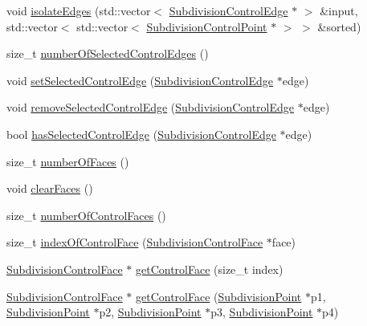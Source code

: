 \begin{DoxyCompactItemize}
\item 
void \hyperlink{classShipCAD_1_1SubdivisionSurface_a975c97ca338eb2aaaa3dcc0640611a95}{isolate\-Edges} (std\-::vector$<$ \hyperlink{classShipCAD_1_1SubdivisionControlEdge}{Subdivision\-Control\-Edge} $\ast$ $>$ \&input, std\-::vector$<$ std\-::vector$<$ \hyperlink{classShipCAD_1_1SubdivisionControlPoint}{Subdivision\-Control\-Point} $\ast$ $>$ $>$ \&sorted)
\item 
size\-\_\-t \hyperlink{classShipCAD_1_1SubdivisionSurface_a28f394042987ccc30d947ddd98a62574}{number\-Of\-Selected\-Control\-Edges} ()
\item 
void \hyperlink{classShipCAD_1_1SubdivisionSurface_ae1ceb8323935d0734fe4dc9c324aca16}{set\-Selected\-Control\-Edge} (\hyperlink{classShipCAD_1_1SubdivisionControlEdge}{Subdivision\-Control\-Edge} $\ast$edge)
\item 
void \hyperlink{classShipCAD_1_1SubdivisionSurface_a579077d742f9afc4e1d4ad20ef5a2184}{remove\-Selected\-Control\-Edge} (\hyperlink{classShipCAD_1_1SubdivisionControlEdge}{Subdivision\-Control\-Edge} $\ast$edge)
\item 
bool \hyperlink{classShipCAD_1_1SubdivisionSurface_a3f7856ea95b0c881a1171845c1dc817e}{has\-Selected\-Control\-Edge} (\hyperlink{classShipCAD_1_1SubdivisionControlEdge}{Subdivision\-Control\-Edge} $\ast$edge)
\item 
size\-\_\-t \hyperlink{classShipCAD_1_1SubdivisionSurface_a9f67bb8bbd3a8f61a2b4abacc0cf10e4}{number\-Of\-Faces} ()
\item 
void \hyperlink{classShipCAD_1_1SubdivisionSurface_abf11847b9df1bc590c6c51d292430dd5}{clear\-Faces} ()
\item 
size\-\_\-t \hyperlink{classShipCAD_1_1SubdivisionSurface_a2fb486ba7285a42ae7fdab6e6c289fc5}{number\-Of\-Control\-Faces} ()
\item 
size\-\_\-t \hyperlink{classShipCAD_1_1SubdivisionSurface_aee61b8795a0f16c47df83f0ef0abd2e7}{index\-Of\-Control\-Face} (\hyperlink{classShipCAD_1_1SubdivisionControlFace}{Subdivision\-Control\-Face} $\ast$face)
\item 
\hyperlink{classShipCAD_1_1SubdivisionControlFace}{Subdivision\-Control\-Face} $\ast$ \hyperlink{classShipCAD_1_1SubdivisionSurface_a392f052a12118427919b910e99663d92}{get\-Control\-Face} (size\-\_\-t index)
\item 
\hyperlink{classShipCAD_1_1SubdivisionControlFace}{Subdivision\-Control\-Face} $\ast$ \hyperlink{classShipCAD_1_1SubdivisionSurface_a536574cc453e4790a769a3e7d47b7ff1}{get\-Control\-Face} (\hyperlink{classShipCAD_1_1SubdivisionPoint}{Subdivision\-Point} $\ast$p1, \hyperlink{classShipCAD_1_1SubdivisionPoint}{Subdivision\-Point} $\ast$p2, \hyperlink{classShipCAD_1_1SubdivisionPoint}{Subdivision\-Point} $\ast$p3, \hyperlink{classShipCAD_1_1SubdivisionPoint}{Subdivision\-Point} $\ast$p4)

\end{DoxyCompactItemize}
